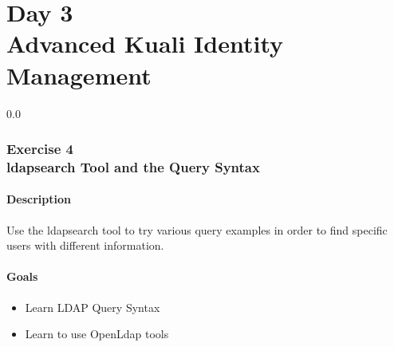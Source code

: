 \part*{Day 3\\
Advanced Kuali Identity Management}

{\setlength{\baselineskip}%
  {0.0\baselineskip}
  \section*{\flushright Exercise 4\\
ldapsearch Tool and the Query Syntax}
  \hrulefill \par}

\subsection*{Description}
Use the ldapsearch tool to try various query examples in order to find
specific users with different information.

\subsection*{Goals}
\begin{itemize}
  \item Learn LDAP Query Syntax
  \item Learn to use OpenLdap tools
\end{itemize}

